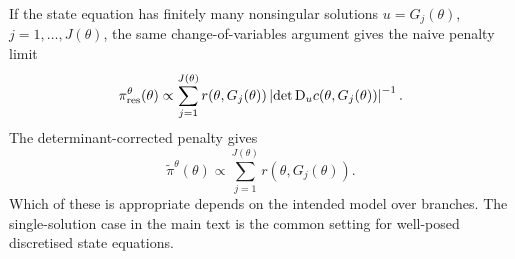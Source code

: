 \documentclass[11pt]{article}
\newcommand{\D}{\mathrm{D}}
\newcommand{\abs}[1]{\left\lvert #1\right\rvert}
\begin{document}
If the state equation has finitely many nonsingular solutions \(u=G_j(\theta)\), \(j=1,\ldots,J(\theta)\), the same change-of-variables argument gives the naive penalty limit
\begin{equation}
 \pi^\theta_{\rm res}(\theta)
 \propto
 \sum_{j=1}^{J(\theta)}
 r(\theta,G_j(\theta))
 \abs{\det\D_u c(\theta,G_j(\theta))}^{-1}.
\end{equation}
The determinant-corrected penalty gives
\begin{equation}
 \widetilde\pi^\theta(\theta)
 \propto
 \sum_{j=1}^{J(\theta)}
 r(\theta,G_j(\theta)).
\end{equation}
Which of these is appropriate depends on the intended model over branches. The single-solution case in the main text is the common setting for well-posed discretised state equations.



\end{document}
